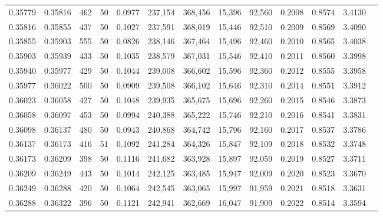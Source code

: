 \begin{tabular}{rrrrrrrrrrrrr}
0.35779 & 0.35816 &   462 &  50 &                                     0.0977 & 237,154 & 368,456 &  15,396 &  92,560 & 0.2008 & 0.8574 & 3.4130 \\
0.35816 & 0.35855 &   437 &  50 &                                     0.1027 & 237,591 & 368,019 &  15,446 &  92,510 & 0.2009 & 0.8569 & 3.4090 \\
0.35855 & 0.35903 &   555 &  50 &                                     0.0826 & 238,146 & 367,464 &  15,496 &  92,460 & 0.2010 & 0.8565 & 3.4038 \\
0.35903 & 0.35939 &   433 &  50 &                                     0.1035 & 238,579 & 367,031 &  15,546 &  92,410 & 0.2011 & 0.8560 & 3.3998 \\
0.35940 & 0.35977 &   429 &  50 &                                     0.1044 & 239,008 & 366,602 &  15,596 &  92,360 & 0.2012 & 0.8555 & 3.3958 \\
0.35977 & 0.36022 &   500 &  50 &                                     0.0909 & 239,508 & 366,102 &  15,646 &  92,310 & 0.2014 & 0.8551 & 3.3912 \\
0.36023 & 0.36058 &   427 &  50 &                                     0.1048 & 239,935 & 365,675 &  15,696 &  92,260 & 0.2015 & 0.8546 & 3.3873 \\
0.36058 & 0.36097 &   453 &  50 &                                     0.0994 & 240,388 & 365,222 &  15,746 &  92,210 & 0.2016 & 0.8541 & 3.3831 \\
0.36098 & 0.36137 &   480 &  50 &                                     0.0943 & 240,868 & 364,742 &  15,796 &  92,160 & 0.2017 & 0.8537 & 3.3786 \\
0.36137 & 0.36173 &   416 &  51 &                                     0.1092 & 241,284 & 364,326 &  15,847 &  92,109 & 0.2018 & 0.8532 & 3.3748 \\
0.36173 & 0.36209 &   398 &  50 &                                     0.1116 & 241,682 & 363,928 &  15,897 &  92,059 & 0.2019 & 0.8527 & 3.3711 \\
0.36209 & 0.36249 &   443 &  50 &                                     0.1014 & 242,125 & 363,485 &  15,947 &  92,009 & 0.2020 & 0.8523 & 3.3670 \\
0.36249 & 0.36288 &   420 &  50 &                                     0.1064 & 242,545 & 363,065 &  15,997 &  91,959 & 0.2021 & 0.8518 & 3.3631 \\
0.36288 & 0.36322 &   396 &  50 &                                     0.1121 & 242,941 & 362,669 &  16,047 &  91,909 & 0.2022 & 0.8514 & 3.3594 \\

\end{tabular}
